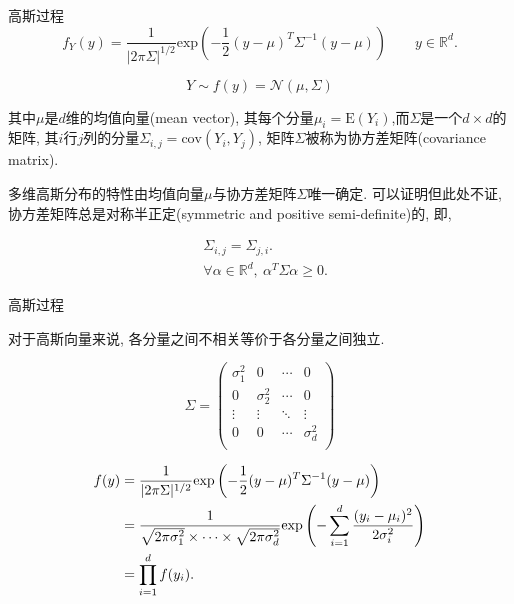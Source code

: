 \begin{frame}[fragile]{高斯过程}
    \begin{equation*}
        f_{Y}(y)=\frac{1}{|2\pi\Sigma|^{1/2}}\mathrm{exp}\left(-\frac{1}{2}(y-\mu)^{T}\Sigma^{-1}(y-\mu)\right) \qquad y\in\mathds{R}^{d}. 
    \end{equation*}

    \begin{equation*}
        Y \sim f(y)=\mathcal{N}(\mu, \Sigma)
    \end{equation*}

    其中$\mu$是$d$维的均值向量(mean vector), 其每个分量$\mu_{i}=\mathrm{E}(Y_{i})$,而$\Sigma$是一个$d\times d$的矩阵, 其$i$行$j$列的分量$\Sigma_{i,j}=\mathrm{cov}(Y_{i},Y_{j})$, 矩阵$\Sigma$被称为协方差矩阵(covariance matrix).

    多维高斯分布的特性由均值向量$\mu$与协方差矩阵$\Sigma$唯一确定. 可以证明但此处不证, 协方差矩阵总是对称半正定(symmetric and positive semi-definite)的, 即,

    \begin{align}
        &\Sigma_{i,j}=\Sigma_{j,i}. \\
        &\forall\alpha\in\mathds{R}^{d},\ \alpha^{T}\Sigma\alpha\geqslant 0.
    \end{align}
\end{frame}

\begin{frame}[fragile]{高斯过程}
    \begin{property}
        对于高斯向量来说, 各分量之间不相关等价于各分量之间独立.
    \end{property}

    \begin{equation}
        \Sigma= \begin{pmatrix}
                    \sigma^{2}_{1} & 0 & \cdots & 0 \\
                    0 & \sigma^{2}_{2} & \cdots & 0 \\ 
                    \vdots & \vdots & \ddots & \vdots \\
                    0 & 0 & \cdots & \sigma^{2}_{d} \\
                \end{pmatrix}
    \end{equation}

    \begin{align}
        f(y)&=\frac{1}{|2\pi\Sigma|^{1/2}}\mathrm{exp}\left(-\frac{1}{2}(y-\mu)^{T}\Sigma^{-1}(y-\mu)\right) \notag \\
        &=\frac{1}{\sqrt{2\pi\sigma^{2}_{1}}\times \dots\times\sqrt{2\pi\sigma^{2}_{d}}} \mathrm{exp}\left(-\sum^{d}_{i=1}\frac{(y_{i}-\mu_{i})^{2}}{2\sigma^{2}_{i}}\right) \notag \\
        &=\prod^{d}_{i=1}f(y_{i}).
    \end{align}    

\end{frame}

